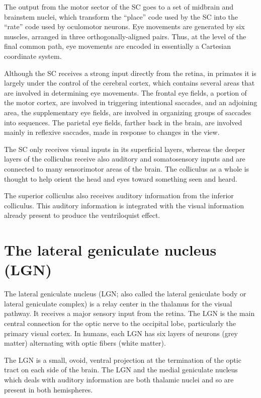 The output from the motor sector of the SC goes to a set of midbrain and brainstem nuclei, which transform the ``place'' code used by the SC into the ``rate'' code used by oculomotor neurons. Eye movements are generated by six muscles, arranged in three orthogonally-aligned pairs. Thus, at the level of the final common path, eye movements are encoded in essentially a Cartesian coordinate system.

Although the SC receives a strong input directly from the retina, in primates it is largely under the control of the cerebral cortex, which contains several areas that are involved in determining eye movements. The frontal eye fields, a portion of the motor cortex, are involved in triggering intentional saccades, and an adjoining area, the supplementary eye fields, are involved in organizing groups of saccades into sequences. The parietal eye fields, farther back in the brain, are involved mainly in reflexive saccades, made in response to changes in the view.

The SC only receives visual inputs in its superficial layers, whereas the deeper layers of the colliculus receive also auditory and somatosensory inputs and are connected to many sensorimotor areas of the brain. The colliculus as a whole is thought to help orient the head and eyes toward something seen and heard.

The superior colliculus also receives auditory information from the inferior colliculus. This auditory information is integrated with the visual information already present to produce the ventriloquist effect.

\hypertarget{the-lateral-geniculate-nucleus-lgn}{%
\section{The lateral geniculate nucleus (LGN)}\label{the-lateral-geniculate-nucleus-lgn}}

The lateral geniculate nucleus (LGN; also called the lateral geniculate body or lateral geniculate complex) is a relay center in the thalamus for the visual pathway. It receives a major sensory input from the retina. The LGN is the main central connection for the optic nerve to the occipital lobe, particularly the primary visual cortex. In humans, each LGN has six layers of neurons (grey matter) alternating with optic fibers (white matter).

The LGN is a small, ovoid, ventral projection at the termination of the optic tract on each side of the brain. The LGN and the medial geniculate nucleus which deals with auditory information are both thalamic nuclei and so are present in both hemispheres.

